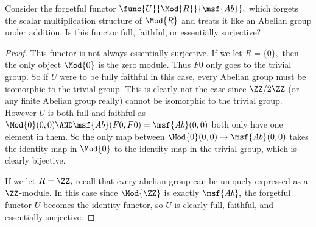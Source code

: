 \documentclass[main.tex]{subfiles}
\begin{document}
\begin{exercise}
	Consider the forgetful functor $ \func{U}{\Mod{R}}{\msf{Ab}}, $ which
	forgets the scalar multiplication structure of $ \Mod{R} $ and treats
	it like an Abelian group under addition. Is this functor full, faithful,
	or essentially surjective?
\end{exercise}
\begin{proof}
	This functor is not always essentially surjective. If we let $ R=\{0\}, $
	then the only object $ \Mod{0}$ is the zero module. Thus $ F0 $ only goes to
	the trivial group. So if $ U $ were to be fully faithful in this case, every
	Abelian group must be isomorphic to the trivial group. This is clearly not
	the case since $ \ZZ/2\ZZ $ (or any finite Abelian group really) cannot be
	isomorphic to the trivial group. However $ U $ is both full and faithful as
	$ \Mod{0}(0,0)\AND \msf{Ab}(F0,F0)=\msf{Ab}(0,0) $ both only have one
	element in them. So the only map between $ \Mod{0}(0,0)\to \msf{Ab}(0,0) $
	takes the identity map in $ \Mod{0} $ to the identity map in the trivial
	group, which is clearly bijective.

	If we let $ R=\ZZ,$ recall that every abelian group can be uniquely
	expressed as a $\ZZ$-module. In this case since $ \Mod{\ZZ} $ is exactly
	$ \msf{Ab},$ the forgetful functor $ U $ becomes the identity functor, so
	$ U $ is clearly full, faithful, and essentially surjective.


\end{proof}
\end{document}
